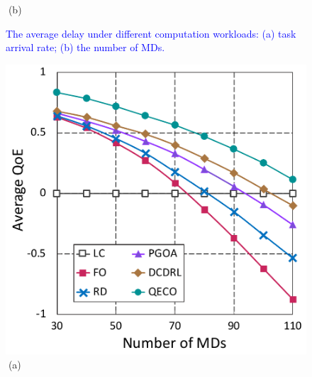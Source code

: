 \documentclass[12pt,draftclsnofoot,onecolumn]{IEEEtran}
\begin{document}
\begin{enumerate}
\begin{figure}[H]
\begin{minipage}[b]{0.3\linewidth}
		\textcolor{white}{i}\hspace{0.6cm}(b)
	\end{minipage}
	
	\caption{\textcolor{blue}{The average delay under different computation workloads: (a) task arrival rate; (b) the number of MDs.}}
	\label{chart3}
\end{figure} \vspace{-8mm}
\begin{figure}[H]\centering
	\captionsetup{name=Fig.}
	\begin{minipage}[b]{0.3\linewidth}
		\centering
		\includegraphics[width=\textwidth]{ qoe_2} 		
		\textcolor{white}{i}\hspace{0.6cm}(a)
	\end{minipage}
	\hspace{-0.2cm}
	\begin{minipage}[b]{0.3\linewidth}
		\centering

\end{minipage}
\end{figure}
\end{enumerate}
\end{document}
